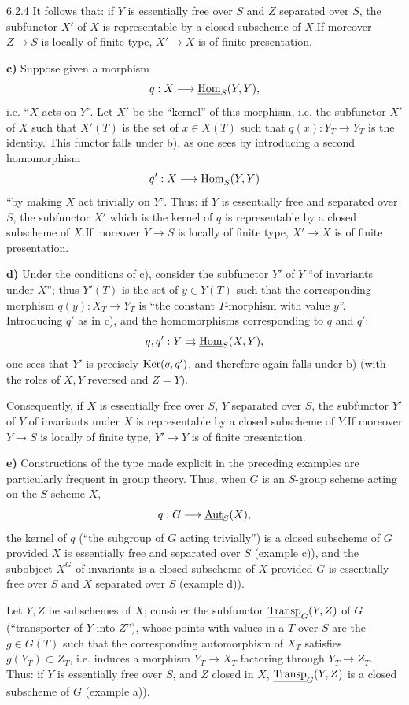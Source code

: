 \begin{examples}{6.2.4}
It follows that: if $Y$ is essentially free over $S$ and $Z$ separated over $S$, the subfunctor $X'$ of $X$ is representable by a closed subscheme of $X$.\footnotemark[56] If moreover $Z\to S$ is locally of finite type, $X'\to X$ is of finite presentation.

\textbf{c)} Suppose given a morphism
\[
q:X\longrightarrow\underline{\operatorname{Hom}}_S(Y,Y),
\]
i.e. ``$X$ acts on $Y$''. Let $X'$ be the ``kernel'' of this morphism, i.e. the subfunctor $X'$ of $X$ such that $X'(T)$ is the set of $x\in X(T)$ such that $q(x):Y_T\to Y_T$ is the identity. This functor falls under b), as one sees by introducing a second homomorphism
\[
q':X\longrightarrow\underline{\operatorname{Hom}}_S(Y,Y)
\]
``by making $X$ act trivially on $Y$''. Thus: if $Y$ is essentially free and separated over $S$, the subfunctor $X'$ which is the kernel of $q$ is representable by a closed subscheme of $X$.\footnotemark[56] If moreover $Y\to S$ is locally of finite type, $X'\to X$ is of finite presentation.

\textbf{d)} Under the conditions of c), consider the subfunctor $Y'$ of $Y$ ``of invariants under $X$''; thus $Y'(T)$ is the set of $y\in Y(T)$ such that the corresponding morphism $q(y):X_T\to Y_T$ is ``the constant $T$-morphism with value $y$''. Introducing $q'$ as in c), and the homomorphisms corresponding to $q$ and $q'$:
\[
q,q':Y\rightrightarrows\underline{\operatorname{Hom}}_S(X,Y),
\]
one sees that $Y'$ is precisely $\operatorname{Ker}(q,q')$, and therefore again falls under b) (with the roles of $X,Y$ reversed and $Z=Y$).

Consequently, if $X$ is essentially free over $S$, $Y$ separated over $S$, the subfunctor $Y'$ of $Y$ of invariants under $X$ is representable by a closed subscheme of $Y$.\footnotemark[56] If moreover $Y\to S$ is locally of finite type, $Y'\to Y$ is of finite presentation.

\textbf{e)} Constructions of the type made explicit in the preceding examples are particularly frequent in group theory. Thus, when $G$ is an $S$-group scheme acting on the $S$-scheme $X$,
\[
q:G\longrightarrow\underline{\operatorname{Aut}}_S(X),
\]
the kernel of $q$ (``the subgroup of $G$ acting trivially'') is a closed subscheme of $G$ provided $X$ is essentially free and separated over $S$ (example c)), and the subobject $X^G$ of invariants is a closed subscheme of $X$ provided $G$ is essentially free over $S$ and $X$ separated over $S$ (example d)).

Let $Y,Z$ be subschemes of $X$; consider the subfunctor $\underline{\operatorname{Transp}}_G(Y,Z)$ of $G$ (``transporter of $Y$ into $Z$''), whose points with values in a $T$ over $S$ are the $g\in G(T)$ such that the corresponding automorphism of $X_T$ satisfies $g(Y_T)\subset Z_T$, i.e. induces a morphism $Y_T\to X_T$ factoring through $Y_T\to Z_T$. Thus: if $Y$ is essentially free over $S$, and $Z$ closed in $X$, $\underline{\operatorname{Transp}}_G(Y,Z)$ is a closed subscheme of $G$ (example a)).


\end{examples}
